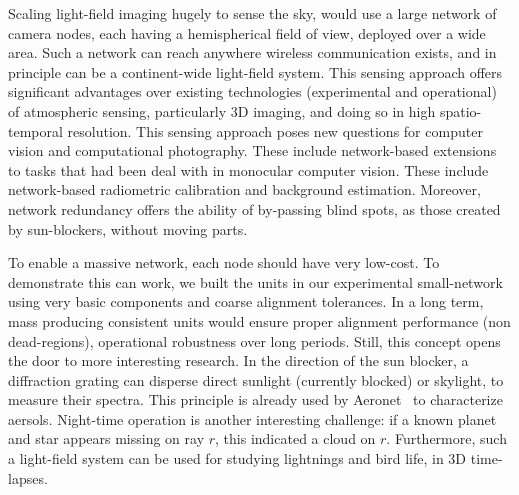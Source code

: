 \documentclass[runningheads]{llncs}
\begin{document}
Scaling light-field imaging hugely to sense the sky, would use  a large network of camera nodes, each having a hemispherical field of view, deployed over a wide area. Such a network can reach anywhere wireless communication exists, and in principle can be a continent-wide light-field system. This sensing approach offers significant advantages over existing technologies (experimental and operational) of atmospheric sensing, particularly  3D imaging, and doing so in high spatio-temporal resolution. This sensing approach poses new questions for computer vision and computational photography. These include network-based extensions to tasks that had been deal with in monocular computer vision. These include network-based radiometric calibration and background estimation. Moreover, network redundancy offers the ability of by-passing blind spots, as those created by sun-blockers, without moving parts.

To enable a massive network, each node should have very low-cost. To demonstrate this can work, we built the units in our experimental small-network using very basic components and coarse alignment tolerances. In a long term, mass producing consistent units would ensure proper alignment performance (non dead-regions), operational robustness over long periods. Still, this concept opens the door to more interesting research. In the direction of the sun blocker, a diffraction grating can disperse direct sunlight (currently blocked) or skylight, to measure their spectra. This principle is already used by Aeronet~\cite{Holben1998} to characterize aersols. Night-time operation is another interesting challenge: if a known planet and star appears missing on ray $r$, this indicated a cloud on $r$. Furthermore, such a light-field system can be used for studying lightnings and bird life, in 3D time-lapses.







\end{document}
